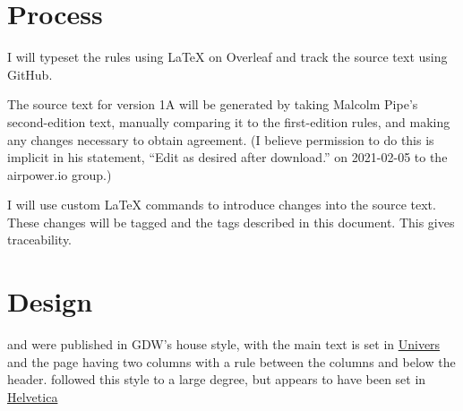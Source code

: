 \documentclass[10pt]{article}
\begin{document}
% 

\section{Process}

I will typeset the rules using LaTeX on Overleaf and track the source text using GitHub.

The source text for version 1A will be generated by taking Malcolm Pipe’s second-edition text, manually comparing it to the first-edition rules, and making any changes necessary to obtain agreement. (I believe permission to do this is implicit in his statement, “Edit as desired after download.” on 2021-02-05 to the airpower.io group.)

I will use custom LaTeX commands to introduce changes into the source text. These changes will be tagged and the tags described in this document. This gives traceability.

\section{Design}



{\AirSup} and {\AirStr} were published in GDW’s house style, with the main text is set in \href{https://en.wikipedia.org/wiki/Univers}{Univers} and the page having two columns with a rule between the columns and below the header. {\TSOH} followed this style to a large degree, but appears to have been set in \href{https://en.wikipedia.org/wiki/Helvetica}{Helvetica}
\end{document}
